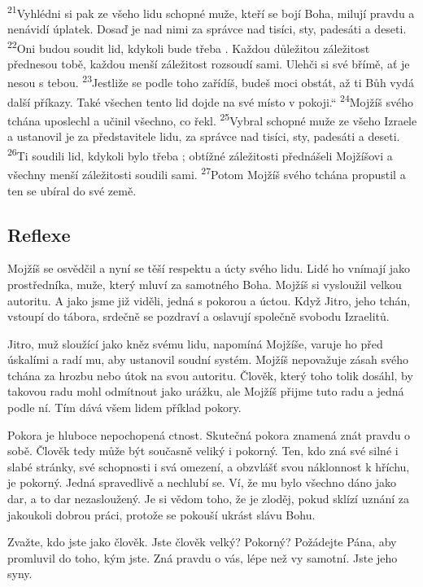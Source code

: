 \documentclass[11pt]{article}
\begin{document}
{\textsuperscript{21}Vyhlédni si pak ze všeho lidu schopné muže, kteří se bojí Boha, milují pravdu a nenávidí úplatek. Dosaď je nad nimi za správce nad tisíci, sty, padesáti a deseti.
\textsuperscript{22}Oni budou soudit lid, kdykoli bude třeba . Každou důležitou záležitost přednesou tobě, každou menší záležitost rozsoudí sami. Ulehči si své břímě, ať je nesou s tebou.
\textsuperscript{23}Jestliže se podle toho zařídíš, budeš moci obstát, až ti Bůh vydá další příkazy. Také všechen tento lid dojde na své místo v pokoji.“
\textsuperscript{24}Mojžíš svého tchána uposlechl a učinil všechno, co řekl.
\textsuperscript{25}Vybral schopné muže ze všeho Izraele a ustanovil je za představitele lidu, za správce nad tisíci, sty, padesáti a deseti.
\textsuperscript{26}Ti soudili lid, kdykoli bylo třeba ; obtížné záležitosti přednášeli Mojžíšovi a všechny menší záležitosti soudili sami.
\textsuperscript{27}Potom Mojžíš svého tchána propustil a ten se ubíral do své země.
}

\subsection*{Reflexe}
Mojžíš se osvědčil a nyní se těší respektu a úcty svého lidu. Lidé ho vnímají jako prostředníka, muže, který
mluví za samotného Boha. Mojžíš si vysloužil velkou autoritu. A jako jsme již viděli, jedná s pokorou a úctou.
Když Jitro, jeho tchán, vstoupí do tábora, srdečně se pozdraví a oslavují společně svobodu Izraelitů.

Jitro, muž sloužící jako kněz svému lidu, napomíná Mojžíše, varuje ho před úskalími a radí mu, aby ustanovil
soudní systém. Mojžíš nepovažuje zásah svého tchána za hrozbu nebo útok na svou autoritu. Člověk, který
toho tolik dosáhl, by takovou radu mohl odmítnout jako urážku, ale Mojžíš přijme tuto radu a jedná podle ní.
Tím dává všem lidem příklad pokory.

Pokora je hluboce nepochopená ctnost. Skutečná pokora znamená znát pravdu o sobě. Člověk tedy může být
současně veliký i pokorný. Ten, kdo zná své silné i slabé stránky, své schopnosti i svá omezení, a obzvlášť
svou náklonnost k hříchu, je pokorný. Jedná spravedlivě a nechlubí se. Ví, že mu bylo všechno dáno jako dar,
a to dar nezasloužený. Je si vědom toho, že je zloděj, pokud sklízí uznání za jakoukoli dobrou práci, protože
se pokouší ukrást slávu Bohu.

Zvažte, kdo jste jako člověk. Jste člověk velký? Pokorný? Požádejte Pána, aby promluvil do toho, kým jste.
Zná pravdu o vás, lépe než vy samotní. Jste jeho syny.
\end{document}
